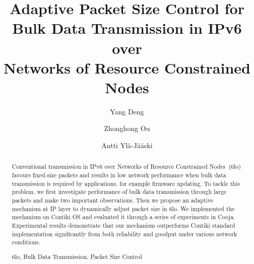 \documentclass[runningheads,a4paper]{llncs}
\newcommand{\keywords}[1]{\par\addvspace\baselineskip
\noindent\keywordname\enspace\ignorespaces#1}
\begin{document}
\mainmatter

\title{Adaptive Packet Size Control for \\Bulk Data Transmission in IPv6 over \\Networks of Resource Constrained Nodes}

\author{Yang Deng\and Zhonghong Ou\and Antti Yl\"a-J\"a\"aski}


\maketitle

\begin{abstract}
Conventional transmission in IPv6 over Networks of Resource Constrained Nodes~(6lo) favours fixed-size packets and results in low network performance when bulk data transmission is required by applications, for example firmware updating. To tackle this problem, we first investigate performance of bulk data transmission through large packets and make two important observations. Then we propose an adaptive mechanism at IP layer to dynamically adjust packet size in 6lo. We implemented the mechanism on Contiki OS and evaluated it through a series of experiments in Cooja. Experimental results demonstrate that our mechanism outperforms Contiki standard implementation significantly from both reliability and goodput under various network conditions.

\keywords{6lo, Bulk Data Transmission, Packet Size Control}
\end{abstract}
\end{document}
